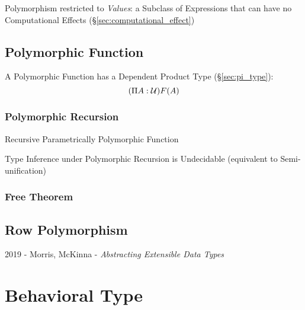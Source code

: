 Polymorphism restricted to \emph{Values}: a Subclass of Expressions
that can have no Computational Effects
(\S\ref{sec:computational_effect})



\subsection{Polymorphic Function}\label{sec:polymorphic_function}

A Polymorphic Function has a Dependent Product Type
(\S\ref{sec:pi_type}):
\[
  (\Pi A:\mathcal{U}) F(A)
\]



\subsubsection{Polymorphic Recursion}\label{sec:polymorphic_recursion}

Recursive Parametrically Polymorphic Function

Type Inference under Polymorphic Recursion is Undecidable (equivalent
to Semi-unification) %



\subsubsection{Free Theorem}\label{sec:free_theorem}



\subsection{Row Polymorphism}\label{sec:row_polymorphism}

2019 - Morris, McKinna - \emph{Abstracting Extensible Data Types}



\section{Behavioral Type}\label{sec:behavioral_type}

